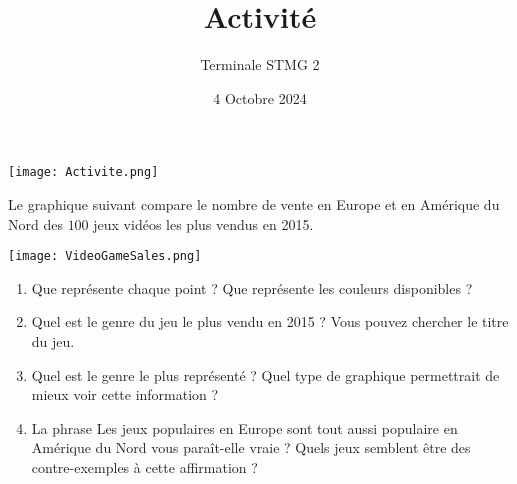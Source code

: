 \documentclass{article}
\title{Activité}
\date{4 Octobre 2024}
\author{Terminale STMG 2}
\begin{document}
\begin{center}    
\texttt{[image: Activite.png]}
\end{center}

\newpage

Le graphique suivant compare le nombre de vente en Europe et en Amérique du Nord des $100$ jeux vidéos les plus vendus en 2015.
\begin{center}
\texttt{[image: VideoGameSales.png]}
\end{center}

\begin{enumerate}
\item Que représente chaque point ? Que représente les couleurs disponibles ?
\item Quel est le genre du jeu le plus vendu en 2015 ? Vous pouvez chercher le titre du jeu.
\item Quel est le genre le plus représenté ? Quel type de graphique permettrait de mieux voir cette information ?
\item La phrase \og Les jeux populaires en Europe sont tout aussi populaire en Amérique du Nord \fg vous paraît-elle vraie ? Quels jeux semblent être des contre-exemples à cette affirmation ?
\end{enumerate}
\end{document}
